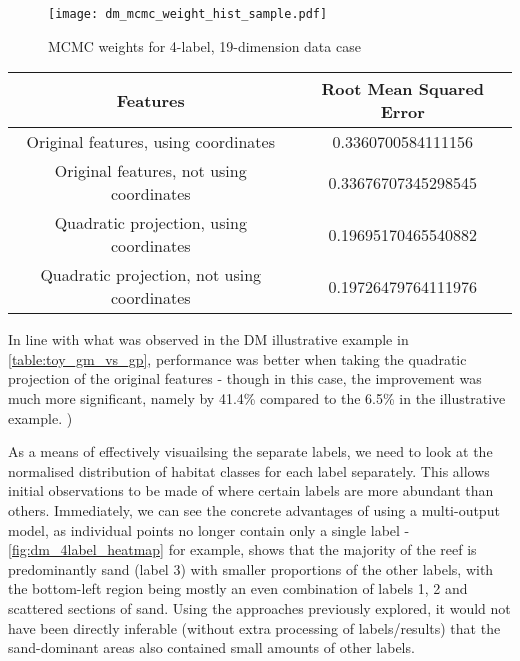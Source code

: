 
\begin{figure}[H]
    \centerline{\texttt{[image: dm\_mcmc\_weight\_hist\_sample.pdf]}}
    \caption{MCMC weights for 4-label, 19-dimension data case }
    \label{fig:mcmc_weights}
\end{figure}

\begin{tabular}{|c|c|}
    \hline
        Features & Root Mean Squared Error \\\hline
        Original features, using coordinates & 0.3360700584111156 \\
        Original features, not using coordinates & 0.33676707345298545 \\
        Quadratic projection, using coordinates & 0.19695170465540882 \\
        Quadratic projection, not using coordinates & 0.19726479764111976 \\
    \hline
\end{tabular}

In line with what was observed in the DM illustrative example in \autoref{table:toy_gm_vs_gp}, performance was better when taking the quadratic projection of the original features - though in this case, the improvement was much more significant, namely by 41.4\% compared to the 6.5\% in the illustrative example. )

As a means of effectively visuailsing the separate labels, we need to look at the normalised distribution of habitat classes for each label separately. This allows initial observations to be made of where certain labels are more abundant than others. Immediately, we can see the concrete advantages of using a multi-output model, as individual points no longer contain only a single label - \autoref{fig:dm_4label_heatmap} for example, shows that the majority of the reef is predominantly sand (label 3) with smaller proportions of the other labels, with the bottom-left region being mostly an even combination of labels 1, 2  and scattered sections of sand. Using the approaches previously explored, it would not have been directly inferable (without extra processing of labels/results) that the sand-dominant areas also contained small amounts of other labels.

